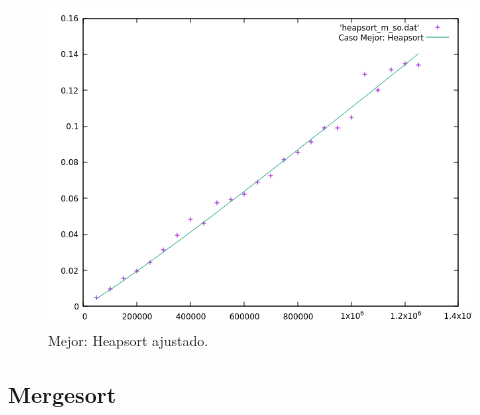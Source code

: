 \documentclass[a4paper,12pt,twoside]{article} %
\begin{document}
\begin{itemize}
\begin{figure}[h]
\begin{center}
  	\includegraphics[scale=0.8]{heapsort_m_so_a.png}
  	\caption{Mejor: Heapsort ajustado.}
  	
  \end{center}
\end{figure}
	
	
	\end{itemize}
\newpage
	
	

\subsection{Mergesort}
\end{document}
